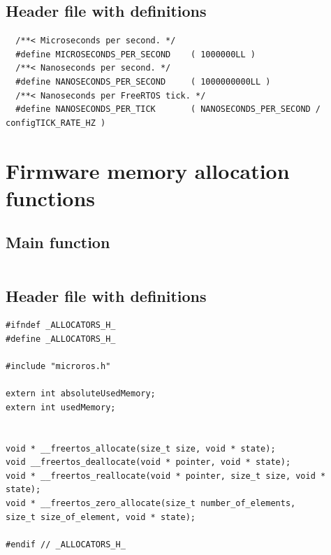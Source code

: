 \documentclass[10pt]{article}
\begin{document}
\subsection{Header file with definitions}
\begin{verbatim}
  /**< Microseconds per second. */
  #define MICROSECONDS_PER_SECOND    ( 1000000LL )  
  /**< Nanoseconds per second. */
  #define NANOSECONDS_PER_SECOND     ( 1000000000LL ) 
  /**< Nanoseconds per FreeRTOS tick. */  
  #define NANOSECONDS_PER_TICK       ( NANOSECONDS_PER_SECOND / configTICK_RATE_HZ ) 
\end{verbatim}


\pagebreak
\section{Firmware memory allocation functions}
\label{sec:allocfunctions}

\subsection{Main function}
\inputminted[linenos]{c}{./src/allocators.c}

\subsection{Header file with definitions}
\begin{verbatim}
#ifndef _ALLOCATORS_H_
#define _ALLOCATORS_H_

#include "microros.h"

extern int absoluteUsedMemory;
extern int usedMemory;


void * __freertos_allocate(size_t size, void * state);
void __freertos_deallocate(void * pointer, void * state);
void * __freertos_reallocate(void * pointer, size_t size, void * state);
void * __freertos_zero_allocate(size_t number_of_elements,
size_t size_of_element, void * state);

#endif // _ALLOCATORS_H_
\end{verbatim}
\end{document}

